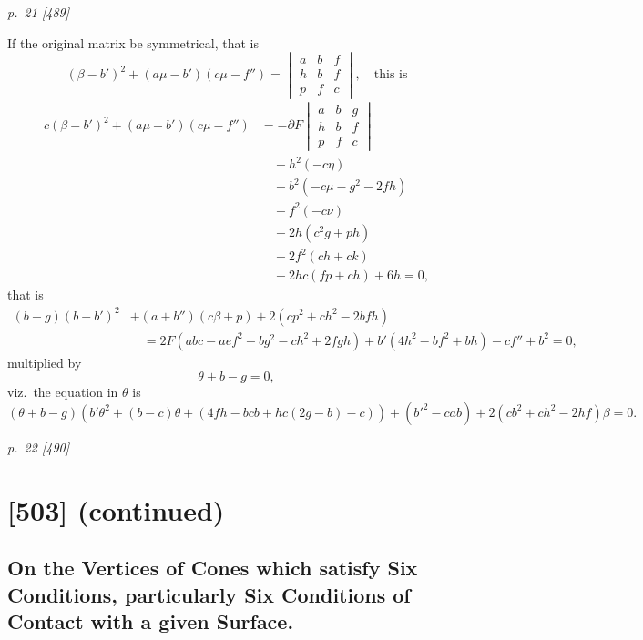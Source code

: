 \documentclass[11pt,a4paper]{book}
\begin{document}
\clearpage

\bigskip
\textit{p.~21 [489]}
\smallskip

If the original matrix be symmetrical, that is
\[
(\beta - b')^2 + (a\mu - b')(c\mu - f'') = \begin{vmatrix} a & b & f \\ h & b & f \\ p & f & c \end{vmatrix}, \quad \text{this is}
\]
\begin{align*}
c(\beta - b')^2 + (a\mu - b')(c\mu - f'') &= -\partial F\begin{vmatrix} a & b & g \\ h & b & f \\ p & f & c \end{vmatrix}\\
&\quad + h^2(-c\eta)\\
&\quad + b^2(-c\mu - g^2 - 2f h)\\
&\quad + f^2(-c\nu)\\
&\quad + 2h(c^2g + ph)\\
&\quad + 2f^2(ch + ck)\\
&\quad + 2h c(fp + ch) + 6h = 0,
\end{align*}
that is
\begin{align*}
(b - g)(b - b')^2 &+ (a + b'')(c\beta + p) + 2(cp^2 + ch^2 - 2bfh)\\
&\quad = 2F(abc - aef^2 - bg^2 - ch^2 + 2fgh) + b'(4h^2 - bf^2 + bh) - cf'' + b^2 = 0,
\end{align*}
multiplied by
\[
\theta + b - g = 0,
\]
viz.\ the equation in $\theta$ is
\[
(\theta + b - g)(b'\theta^2 + (b - c)\theta + (4f h - bcb + h c(2g - b) - c)) + (b'^2 - cab) + 2(cb^2 + ch^2 - 2hf)\beta = 0.
\]

\clearpage

\bigskip
\textit{p.~22 [490]}
\smallskip
\clearpage


\section{[503] (continued)}
\subsection{On the Vertices of Cones which satisfy Six Conditions, particularly Six Conditions of Contact with a given Surface.}
\end{document}
